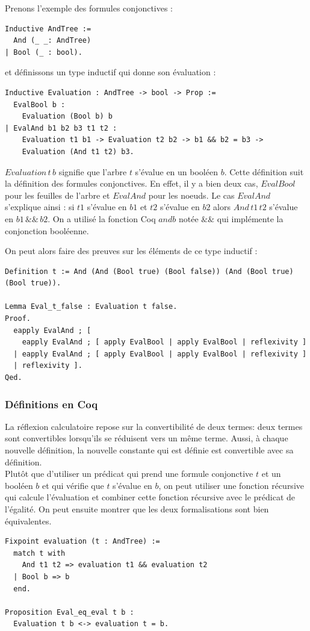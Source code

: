 \documentclass[11pt]{article}
\begin{document}
Prenons l'exemple des formules conjonctives : 

\begin{lstlisting}[frame=single]
Inductive AndTree :=
  And (_ _: AndTree)
| Bool (_ : bool).
\end{lstlisting}

et définissons un type inductif qui donne son évaluation : 

\begin{lstlisting}[frame=single]
Inductive Evaluation : AndTree -> bool -> Prop :=
  EvalBool b :
    Evaluation (Bool b) b
| EvalAnd b1 b2 b3 t1 t2 :
    Evaluation t1 b1 -> Evaluation t2 b2 -> b1 && b2 = b3 ->
    Evaluation (And t1 t2) b3.
\end{lstlisting}
$Evaluation \, t \, b$ signifie que l'arbre $t$ s'évalue en un booléen $b$. Cette définition suit la définition des formules conjonctives. En effet, il y a bien deux cas, $EvalBool$ pour les feuilles de l'arbre et $EvalAnd$ pour les noeuds. Le cas $EvalAnd$ s'explique ainsi : si $t1$ s'évalue en $b1$ et $t2$ s'évalue en $b2$ alors $And \, t1 \, t2$ s'évalue en $b1\,\&\&\,b2$.  On a utilisé la fonction Coq $andb$ notée $\&\&$ qui implémente la conjonction booléenne.

On peut alors faire des preuves sur les éléments de ce type inductif : 
\begin{lstlisting}[frame=single]
Definition t := And (And (Bool true) (Bool false)) (And (Bool true) (Bool true)).

Lemma Eval_t_false : Evaluation t false.
Proof.
  eapply EvalAnd ; [
    eapply EvalAnd ; [ apply EvalBool | apply EvalBool | reflexivity ]
  | eapply EvalAnd ; [ apply EvalBool | apply EvalBool | reflexivity ]
  | reflexivity ].
Qed.
\end{lstlisting}

\subsubsection{Définitions en Coq}

La réflexion calculatoire repose sur la convertibilité de deux termes: deux termes sont convertibles lorsqu'ils se réduisent vers un même terme. Aussi, à chaque nouvelle définition, la nouvelle constante qui est définie est convertible avec sa définition. \\

Plutôt que d'utiliser un prédicat qui prend une formule conjonctive $t$ et un booléen $b$ et qui vérifie que $t$ s'évalue en $b$, on peut utiliser une fonction récursive qui calcule l'évaluation et combiner cette fonction récursive avec le prédicat de l'égalité. On peut ensuite montrer que les deux formalisations sont bien équivalentes.  
\begin{lstlisting}[frame=single]
Fixpoint evaluation (t : AndTree) :=
  match t with
    And t1 t2 => evaluation t1 && evaluation t2
  | Bool b => b
  end.
  
Proposition Eval_eq_eval t b :
  Evaluation t b <-> evaluation t = b.
  
\end{lstlisting}
\end{document}
